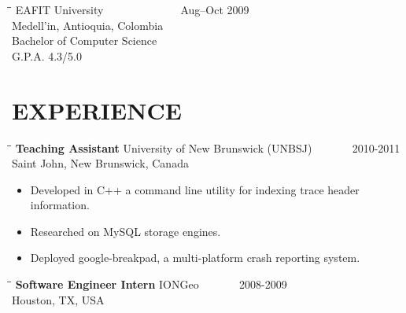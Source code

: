 \documentclass{res}
\begin{document}
\begin{resume}
   \begin{tabbing}
   \hspace{2.3in}\= \hspace{2.6in}\= \kill %
        EAFIT University\> ~~~~~~ \> ~~~~~~ Aug--Oct 2009\\
        Medell\a'in, Antioquia, Colombia\\
        Bachelor of Computer Science\\
        G.P.A. 4.3/5.0\\
   \end{tabbing}\vspace{-20pt}      %

\section{EXPERIENCE}
   \vspace{0.05 in}	
   \begin{tabbing}
   \hspace{2.3in}\= \hspace{2.6in}\= \kill %
    {\bf Teaching Assistant} \>University of New Brunswick (UNBSJ)\> ~~~~~~ 2010-2011\\
                             \>Saint John, New Brunswick, Canada
   \end{tabbing}\vspace{-5pt}      %

   \begin{itemize}
       \item Developed in C++ a command line utility for indexing trace header information.
       \item Researched on MySQL storage engines.
       \item Deployed google-breakpad, a multi-platform crash reporting system.
   \end{itemize}

   \begin{tabbing}
   \hspace{2.3in}\= \hspace{2.6in}\= \kill %
    {\bf Software Engineer Intern} \>IONGeo\> ~~~~~~ 2008-2009\\
                             \>Houston, TX, USA
   \end{tabbing}\vspace{-5pt}      %


\end{resume}
\end{document}

